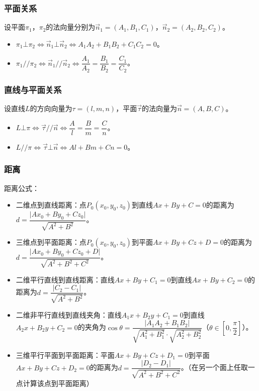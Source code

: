 \documentclass[UTF8, 12pt]{ctexart}
\begin{document}
\subsubsection{平面关系}

设平面$\pi_1$，$\pi_2$的法向量分别为$\vec{n}_1=(A_1,B_1,C_1)$，$\vec{n}_2=(A_2,B_2,C_2)$。

\begin{itemize}
    \item $\pi_1\bot\pi_2\Leftrightarrow\vec{n}_1\bot\vec{n}_2\Leftrightarrow A_1A_2+B_1B_2+C_1C_2=0$。
    \item $\pi_1//\pi_2\Leftrightarrow\vec{n}_1//\vec{n}_2\Leftrightarrow\dfrac{A_1}{A_2}=\dfrac{B_1}{B_2}=\dfrac{C_1}{C_2}$。
\end{itemize}

\subsubsection{直线与平面关系}

设直线$L$的方向向量为$\tau=(l,m,n)$，平面$\vec{\tau}$的法向量为$\vec{n}=(A,B,C)$。

\begin{itemize}
    \item $L\bot\pi\Leftrightarrow\vec{\tau}//\vec{n}\Leftrightarrow\dfrac{A}{l}=\dfrac{B}{m}=\dfrac{C}{n}$。
    \item $L//\pi\Leftrightarrow\vec{\tau}\bot\vec{n}\Leftrightarrow Al+Bm+Cn=0$。
\end{itemize}

\subsubsection{距离}

距离公式：

\begin{itemize}
    \item 二维点到直线距离：点$P_0(x_0,y_0,z_0)$到直线$Ax+By+C=0$的距离为$d=\dfrac{\vert Ax_0+By_0+Cz_0\vert}{\sqrt{A^2+B^2}}$。
    \item 三维点到平面距离：点$P_0(x_0,y_0,z_0)$到平面$Ax+By+Cz+D=0$的距离为$d=\dfrac{\vert Ax_0+By_0+Cz_0+D\vert}{\sqrt{A^2+B^2+C^2}}$。
    \item 二维平行直线到直线距离：直线$Ax+By+C_1=0$到直线$Ax+By+C_2=0$的距离为$d=\dfrac{\vert C_2-C_1\vert}{\sqrt{A^2+B^2}}$。
    \item 二维非平行直线到直线夹角：直线$A_1x+B_2y+C_1=0$到直线$A_2x+B_2y+C_2=0$的夹角为$\cos\theta=\dfrac{\vert A_1A_2+B_1B_2\vert}{\sqrt{A_1^2+B_1^2}\cdot\sqrt{A_2^2+B_2^2}}$（$\theta\in\left[0,\dfrac{\pi}{2}\right]$）。
    \item 三维平行平面到平面距离：平面$Ax+By+Cz+D_1=0$到平面$Ax+By+Cz+D_2=0$的距离为$d=\dfrac{\vert D_2-D_1\vert}{\sqrt{A^2+B^2+C^2}}$。（在另一个面上任取一点计算该点到平面距离）
\end{itemize}
\end{document}
